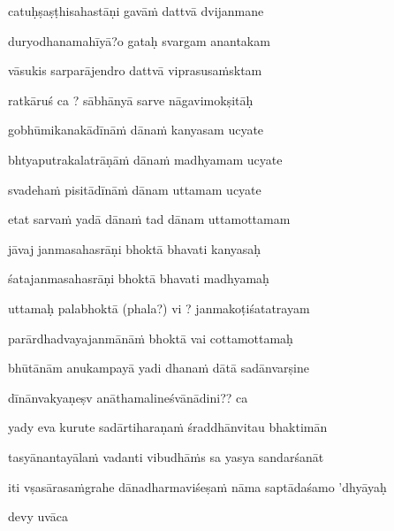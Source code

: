 catuḥṣaṣṭhisahastāṇi gavā\.m dattvā dvijanmane\thinspace{\dandab} \dontdisplaylinenum

duryodhanamahīyā?o gataḥ svargam anantakam \veg\dontdisplaylinenum

vāsukis sarparājendro dattvā viprasusa\.msktam\thinspace{\dandab} \dontdisplaylinenum

ratkāruś ca ? sābhānyā sarve nāgavimokṣitāḥ \veg\dontdisplaylinenum

gobhūmikanakādīnā\.m dāna\.m kanyasam ucyate\thinspace{\dandab} \dontdisplaylinenum

bhtyaputrakalatrāṇā\.m dāna\.m madhyamam ucyate \veg\dontdisplaylinenum

svadeha\.m pisitādīnā\.m dānam uttamam ucyate\thinspace{\dandab} \dontdisplaylinenum

etat sarva\.m yadā dāna\.m tad dānam uttamottamam \veg\dontdisplaylinenum

jāvaj janmasahasrāṇi bhoktā bhavati kanyasaḥ\thinspace{\dandab} \dontdisplaylinenum

śatajanmasahasrāṇi bhoktā bhavati madhyamaḥ \veg\dontdisplaylinenum

uttamaḥ palabhoktā (phala?) vi ? janmakoṭiśatatrayam\thinspace{\dandab} \dontdisplaylinenum 

parārdhadvayajanmānā\.m bhoktā vai cottamottamaḥ \veg\dontdisplaylinenum

bhūtānām anukampayā yadi dhana\.m dātā sadānvarṣine\thinspace{\dandab} \dontdisplaylinenum

dīnānvakyaṇeṣv anāthamalineśvānādini?? ca \veg\dontdisplaylinenum

yady eva kurute sadārtiharaṇa\.m śraddhānvitau bhaktimān\thinspace{\dandab} \dontdisplaylinenum

tasyānantayāla\.m vadanti vibudhā\.ms sa yasya sandarśanāt \veg\dontdisplaylinenum

\vers


\jump
\begin{center}
\ketdanda iti vṣasārasa\.mgrahe dānadharmaviśeṣa\.m nāma saptādaśamo 'dhyāyaḥ\ketdanda
\end{center}
\dontdisplaylinenum\vers 
\bekveg\szamveg\vfill\phpspagebreak\szam\bek{}
\thispagestyle{empty}



\jump\jump
devy uvāca~{\dandab}\dontdisplaylinenum 

